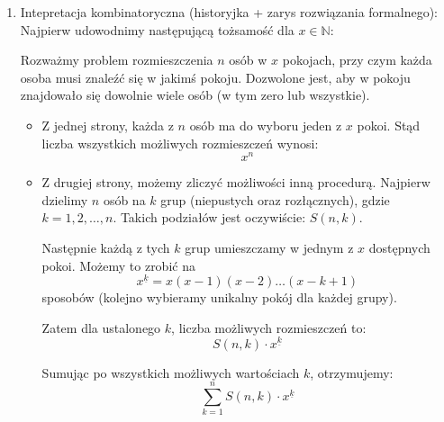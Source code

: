 \documentclass{mwart}
\begin{document}
\begin{mdframed}
    \begin{enumerate}
        \item
        Intepretacja kombinatoryczna (historyjka + zarys rozwiązania formalnego): \newline
        Najpierw udowodnimy następującą tożsamość dla \( x \in \mathbb{N} \):

        \bigskip

        Rozważmy problem rozmieszczenia $n$ osób w $x$ pokojach, przy czym każda osoba musi znaleźć się w jakimś pokoju. Dozwolone jest, aby w pokoju znajdowało się dowolnie wiele osób (w tym zero lub wszystkie).

        \begin{itemize}
            \item Z jednej strony, każda z $n$ osób ma do wyboru jeden z $ x$ pokoi. Stąd liczba wszystkich możliwych rozmieszczeń wynosi:
            \[x^n\]

            \item Z drugiej strony, możemy zliczyć możliwości inną procedurą. Najpierw dzielimy $n$ osób na $k$ grup (niepustych oraz rozłącznych), gdzie \( k = 1, 2, \dots, n \). Takich podziałów jest oczywiście: \( S(n,k) \).

            Następnie każdą z tych $k$ grup umieszczamy w jednym z $x$ dostępnych pokoi. Możemy to zrobić na
            \[x^{\underline{k}} = x(x-1)(x-2)\dots(x-k+1)\]
            sposobów (kolejno wybieramy unikalny pokój dla każdej grupy).

            Zatem dla ustalonego $k$, liczba możliwych rozmieszczeń to:
            \[S(n,k) \cdot x^{\underline{k}}\]

            Sumując po wszystkich możliwych wartościach $k$, otrzymujemy:
            \[\sum_{k=1}^n S(n,k) \cdot x^{\underline{k}}\]
        \end{itemize}

        \bigskip


\end{enumerate}
\end{mdframed}
\end{document}
